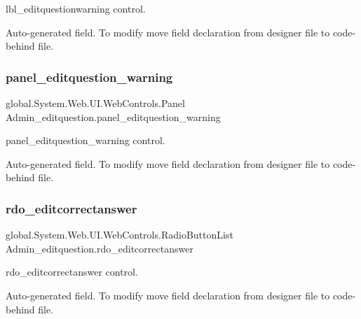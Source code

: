 lbl\+\_\+editquestionwarning control. 

Auto-\/generated field. To modify move field declaration from designer file to code-\/behind file. \mbox{\label{class_admin__editquestion_a05b552b1f2ba5b19854e60f2a8bcb77b}} 
\subsubsection{\texorpdfstring{panel\_editquestion\_warning}{panel\_editquestion\_warning}}
{\footnotesize\ttfamily global.\+System.\+Web.\+U\+I.\+Web\+Controls.\+Panel Admin\+\_\+editquestion.\+panel\+\_\+editquestion\+\_\+warning\hspace{0.3cm}{\ttfamily [protected]}}



panel\+\_\+editquestion\+\_\+warning control. 

Auto-\/generated field. To modify move field declaration from designer file to code-\/behind file. \mbox{\label{class_admin__editquestion_a8e7da5bbc93c3a9942707544e8b45cee}} 
\subsubsection{\texorpdfstring{rdo\_editcorrectanswer}{rdo\_editcorrectanswer}}
{\footnotesize\ttfamily global.\+System.\+Web.\+U\+I.\+Web\+Controls.\+Radio\+Button\+List Admin\+\_\+editquestion.\+rdo\+\_\+editcorrectanswer\hspace{0.3cm}{\ttfamily [protected]}}



rdo\+\_\+editcorrectanswer control. 

Auto-\/generated field. To modify move field declaration from designer file to code-\/behind file. \mbox{\label{class_admin__editquestion_a6813864e69eec1b7fa25d61cd0bd929e}} 
